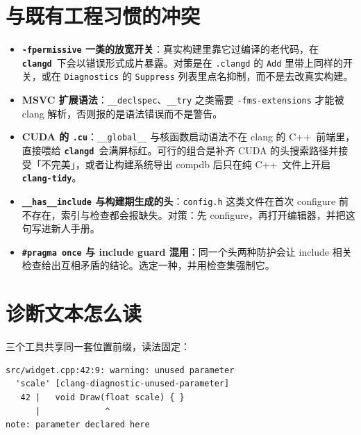 \documentclass[12pt,a4paper,fontset=fandol]{ctexbook}
\newcommand{\Lib}[1]{\textbf{\texttt{#1}}}
\newcommand{\Lang}[1]{\textsf{#1}}
\newcommand{\CPP}{\Lang{C++}}
\newcommand{\Tidy}{\Lib{clang-tidy}}
\newcommand{\CD}{\Lib{clangd}}
\begin{document}
\section{与既有工程习惯的冲突}\label{sec:ch17-s11}

\begin{itemize}
  \item \textbf{\texttt{-fpermissive} 一类的放宽开关}：真实构建里靠它过编译的老代码，在 \CD\ 下会以错误形式成片暴露。对策是在 \texttt{.clangd} 的 \texttt{Add} 里带上同样的开关，或在 \texttt{Diagnostics} 的 \texttt{Suppress} 列表里点名抑制，而不是去改真实构建。
  \item \textbf{MSVC 扩展语法}：\texttt{\_\_declspec}、\texttt{\_\_try} 之类需要 \texttt{-fms-extensions} 才能被 clang 解析，否则报的是语法错误而不是警告。
  \item \textbf{CUDA 的 \texttt{.cu}}：\texttt{\_\_global\_\_} 与核函数启动语法不在 clang 的 \CPP\ 前端里，直接喂给 \CD\ 会满屏标红。可行的组合是补齐 CUDA 的头搜索路径并接受「不完美」，或者让构建系统导出 compdb 后只在纯 \CPP\ 文件上开启 \Tidy。
  \item \textbf{\texttt{\_\_has\_\_include} 与构建期生成的头}：\texttt{config.h} 这类文件在首次 configure 前不存在，索引与检查都会报缺失。对策：先 configure，再打开编辑器，并把这句写进新人手册。
  \item \textbf{\texttt{\#pragma once} 与 include guard 混用}：同一个头两种防护会让 include 相关检查给出互相矛盾的结论。选定一种，并用检查集强制它。
\end{itemize}

\section{诊断文本怎么读}\label{sec:ch17-s12}

三个工具共享同一套位置前缀，读法固定：

\begin{lstlisting}[style=shellstyle,caption={一条典型诊断的部件拆解}]
src/widget.cpp:42:9: warning: unused parameter
  'scale' [clang-diagnostic-unused-parameter]
   42 |   void Draw(float scale) { }
      |             ^
note: parameter declared here
\end{lstlisting}
\end{document}
